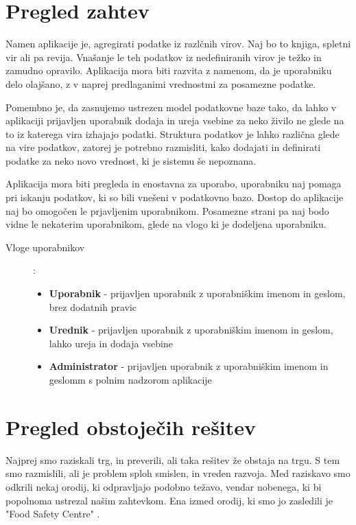 \documentclass[a4paper, 12pt]{book}
\begin{document}
\section{Pregled zahtev}

Namen aplikacije je, agregirati podatke iz razlčnih virov. Naj bo to knjiga, spletni vir ali pa revija. Vnašanje le teh podatkov iz nedefiniranih virov je težko in zamudno opravilo. Aplikacija mora biti razvita z namenom, da je uporabniku delo olajšano, z v naprej predlaganimi vrednostmi za posamezne podatke. 

Pomembno je, da zasnujemo ustrezen model podatkovne baze tako, da lahko v aplikaciji prijavljen uporabnik dodaja in ureja vsebine za neko živilo ne glede na to iz katerega vira izhajajo podatki. 
Struktura podatkov je lahko različna glede na vire podatkov, zatorej je potrebno razmisliti, kako dodajati in definirati podatke za neko novo vrednost, ki je sistemu še nepoznana.

Aplikacija mora biti pregleda in enostavna za uporabo, uporabniku naj pomaga pri iskanju podatkov, ki so bili vnešeni v podatkovno bazo. Dostop do aplikacije naj bo omogočen le prjavljenim uporabnikom. Posamezne strani pa naj bodo vidne le nekaterim uporabnikom, glede na vlogo ki je dodeljena uporabniku.

\begin{description}
\item[Vloge uporabnikov]:
	\begin{itemize}
		\item \textbf{Uporabnik} - prijavljen uporabnik z uporabniškim imenom in geslom, brez dodatnih pravic
		\item \textbf{Urednik} - prijavljen uporabnik z uporabniškim imenom in geslom, lahko ureja in dodaja vsebine
		\item \textbf{Administrator} - prijavljen uporabnik z uporabniškim imenom in geslomm s polnim nadzorom aplikacije
	\end{itemize}
\end{description}

\section{Pregled obstoječih rešitev}

Najprej smo raziskali trg, in preverili, ali taka rešitev že obstaja na trgu. S tem smo razmislili, ali je problem sploh smislen, in vreden razvoja. Med raziskavo smo odkrili nekaj orodij, ki odpravljajo podobno težavo, vendar nobenega, ki bi popolnoma ustrezal našim zahtevkom. 
Ena izmed orodij, ki smo jo zasledili je "Food Safety Centre" \cite{food-safety-centre}.
\end{document}
